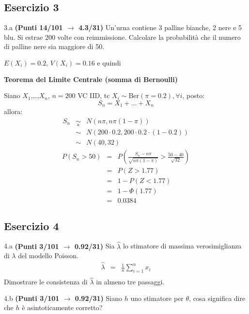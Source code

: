 \documentclass[
  11pt,
]{book}
\theoremstyle{mytheoremstyle}
\theoremstyle{mydefstyle}
\begin{document}
\subsection{Esercizio 3}\label{esercizio-3-12}

3.a \textbf{(Punti 14/101 \(\rightarrow\) 4.3/31)} Un'urna contiene 3 palline bianche, 2 nere e 5 blu. Si estrae 200 volte con reimmissione.
Calcolare la probabilità che il numero di palline nere sia maggiore di 50.

\(E(X_i)=0.2\), \(V(X_i)=0.16\) e quindi

\textbf{Teorema del Limite Centrale (somma di Bernoulli)}

Siano \(X_1\),\ldots,\(X_n\), \(n=200\) VC IID, tc \(X_i\sim\text{Ber}(\pi=0.2)\)\(,\forall i\), posto:
\[
      S_n = X_1 + ... + X_n
      \]
allora:\begin{eqnarray*}
  S_n & \mathop{\sim}\limits_{a}& N(n\pi,n\pi(1-\pi)) \\
      &\sim & N(200\cdot0.2,200\cdot0.2\cdot(1-0.2)) \\
      &\sim & N(40,32)
  \end{eqnarray*}\begin{eqnarray*}
      P( S_n   >   50 ) 
        &=& P\left(  \frac { S_n  -  n\pi }{ \sqrt{n\pi(1-\pi)} }  >  \frac { 50  -  40 }{\sqrt{ 32 }} \right)  \\
                 &=& P\left(  Z   >   1.77 \right) \\    &=& 1-P(Z< 1.77 )\\ 
                 &=&  1-\Phi( 1.77 ) \\ &=&  0.0384 
      \end{eqnarray*}

\subsection{Esercizio 4}\label{esercizio-4-12}

4.a \textbf{(Punti 3/101 \(\rightarrow\) 0.92/31)} Sia \(\hat \lambda\) lo stimatore di massima verosimiglianza di \(\lambda\) del modello Poisson.
\begin{eqnarray*}
  \hat\lambda &=&  \frac 1n\sum_{i=1}^nx_i\\
\end{eqnarray*}
Dimostrare le consistenza di \(\hat\lambda\) in almeno tre passaggi.

4.b \textbf{(Punti 3/101 \(\rightarrow\) 0.92/31)} Siano \(h\) uno stimatore per \(\theta\), cosa significa dire che \(h\) è asintoticamente corretto?
\end{document}
